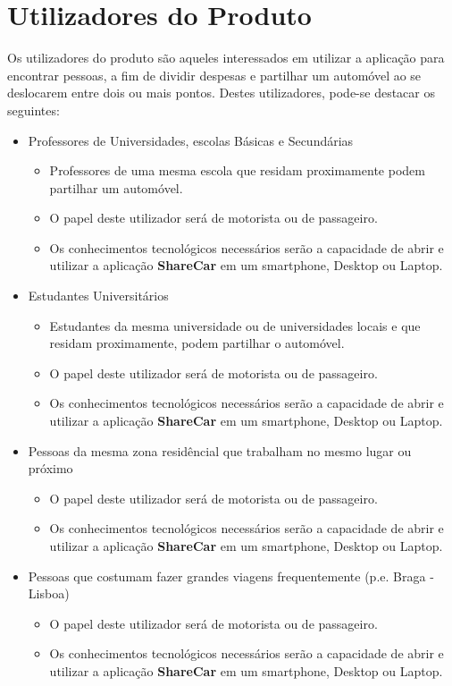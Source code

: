 \section{Utilizadores do Produto}
Os utilizadores do produto são aqueles interessados em utilizar a aplicação para encontrar pessoas, a fim de dividir despesas e partilhar um automóvel ao se deslocarem entre dois ou mais pontos. Destes utilizadores, pode-se destacar os seguintes:

\begin{itemize}
        \item Professores de Universidades, escolas Básicas e Secundárias
        \begin{itemize}
            \item Professores de uma mesma escola que residam proximamente podem partilhar um automóvel.
            \item O papel deste utilizador será de motorista ou de passageiro.
            \item Os conhecimentos tecnológicos necessários serão a capacidade de abrir e utilizar a aplicação \textbf{ShareCar} em um smartphone, Desktop ou Laptop.
        \end{itemize}{}
        \item Estudantes Universitários
        \begin{itemize}
            \item Estudantes da mesma universidade ou de universidades locais e que residam proximamente, podem partilhar o automóvel.
            \item O papel deste utilizador será de motorista ou de passageiro.
            \item Os conhecimentos tecnológicos necessários serão a capacidade de abrir e utilizar a aplicação \textbf{ShareCar} em um smartphone, Desktop ou Laptop.
        \end{itemize}{}
        \item Pessoas da mesma zona residêncial que trabalham no mesmo lugar ou próximo
        \begin{itemize}
            \item O papel deste utilizador será de motorista ou de passageiro.
            \item Os conhecimentos tecnológicos necessários serão a capacidade de abrir e utilizar a aplicação \textbf{ShareCar} em um smartphone, Desktop ou Laptop.
        \end{itemize}{}
        \item Pessoas que costumam fazer grandes viagens frequentemente (p.e. Braga - Lisboa)\begin{itemize}
            \item O papel deste utilizador será de motorista ou de passageiro.
            \item Os conhecimentos tecnológicos necessários serão a capacidade de abrir e utilizar a aplicação \textbf{ShareCar} em um smartphone, Desktop ou Laptop.
        \end{itemize}{}
\end{itemize}{}

